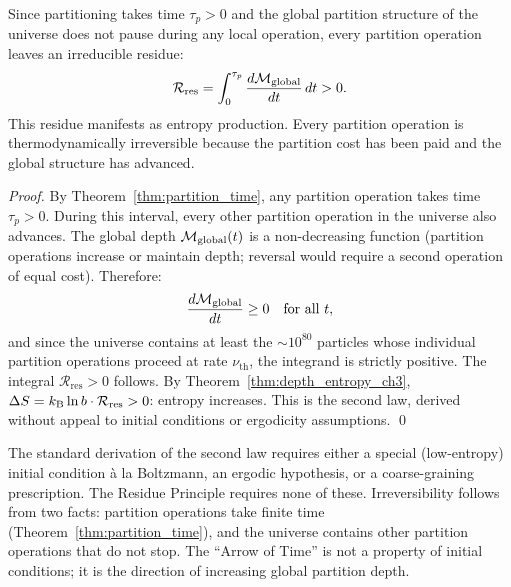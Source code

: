 \begin{corollary}
\label{cor:residue}
Since partitioning takes time $\tau_p > 0$ and the global partition structure
of the universe does not pause during any local operation, every partition
operation leaves an irreducible residue:
\begin{equation}
  \mathcal{R}_{\mathrm{res}} = \int_0^{\tau_p} \frac{d\mathcal{M}_{\mathrm{global}}}{dt}\, dt > 0.
  \label{eq:residue}
\end{equation}
This residue manifests as entropy production. Every partition operation is
thermodynamically irreversible because the partition cost has been paid and
the global structure has advanced.
\end{corollary}

\begin{proof}
By Theorem~\ref{thm:partition_time}, any partition operation takes time
$\tau_p > 0$. During this interval, every other partition operation in the
universe also advances. The global depth $\mathcal{M}_{\mathrm{global}}(t)$ is
a non-decreasing function (partition operations increase or maintain depth;
reversal would require a second operation of equal cost). Therefore:
\begin{equation}
  \frac{d\mathcal{M}_{\mathrm{global}}}{dt} \geq 0 \quad \text{for all } t,
\end{equation}
and since the universe contains at least the $\sim 10^{80}$ particles
whose individual partition operations proceed at rate $\nu_{\mathrm{th}}$,
the integrand is strictly positive. The integral $\mathcal{R}_{\mathrm{res}} > 0$
follows. By Theorem~\ref{thm:depth_entropy_ch3}, $\Delta S = k_{\mathrm{B}} \ln b \cdot \mathcal{R}_{\mathrm{res}} > 0$:
entropy increases. This is the second law, derived without appeal to
initial conditions or ergodicity assumptions. \qed
\end{proof}

\begin{remark}
The standard derivation of the second law requires either a special (low-entropy)
initial condition \`{a} la Boltzmann, an ergodic hypothesis, or a coarse-graining
prescription. The Residue Principle requires none of these. Irreversibility
follows from two facts: partition operations take finite time
(Theorem~\ref{thm:partition_time}), and the universe contains other partition
operations that do not stop. The ``Arrow of Time'' is not a property of
initial conditions; it is the direction of increasing global partition depth.
\end{remark}

